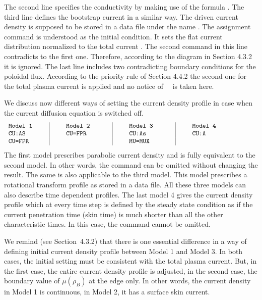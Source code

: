 The second line specifies the conductivity \cite{HR} by making use of
the formula .
The third line defines the bootstrap current in a similar way.
The driven current density is supposed to be stored in a data file under
the name .
The assignment command  is understood as the initial condition.
It sets the flat current distribution normalized to the total current
. 
The second command in this line contradicts to the first one.
Therefore, according to the diagram in Section 4.3.2 it is ignored.
The last line includes two contradicting boundary conditions for the
poloidal flux.
According to the priority rule of Section 4.4.2 the second one for the
total plasma current  is applied and no notice of~~
is taken here. 

We discuss now different ways of setting the current density profile in
case when the current diffusion equation is switched off.
\begin{equation}\label{4models}
\begin{tabular}{p{2cm}|p{3cm}|p{3cm}|p{4cm}}
\tt Model 1&\qq\tt Model 2 &\qq\tt Model 3 &\qq\tt Model 4\\
\tt CU:AS  &\qq\tt CU=FPR  &\qq\tt CU:As   &\qq\tt CU:A   \\
\tt CU=FPR &\qq\tt         &\qq\tt MU=MUX  &\qq\tt        \\
\end{tabular}
\end{equation}
The first model prescribes parabolic current density and is fully  
equivalent to the second model. 
In other words, the command  can be omitted without 
changing the result.
The same is also applicable to the third model.
This model prescribes a rotational transform profile as stored in
a data file. 
All these three models can also describe time dependent profiles. 
The last model 4 gives the current density profile which at every time
step is defined by the steady state condition  as if the
current penetration time (skin time) is much shorter than all the other
characteristic times. 
In this case, the command  cannot be omitted.

We remind (see Section~4.3.2) that there is one essential difference in
a way of defining initial current density profile between Model 1 and
Model 3. 
In both cases, the initial setting must be consistent with the total
plasma current.
But, in the first case, the entire current density profile is adjusted,
in the second case, the boundary value of $\mu(\rho_B)$ at the edge
only. 
In other words, the current density in Model 1 is continuous, in Model 2,
it has a surface skin current.

